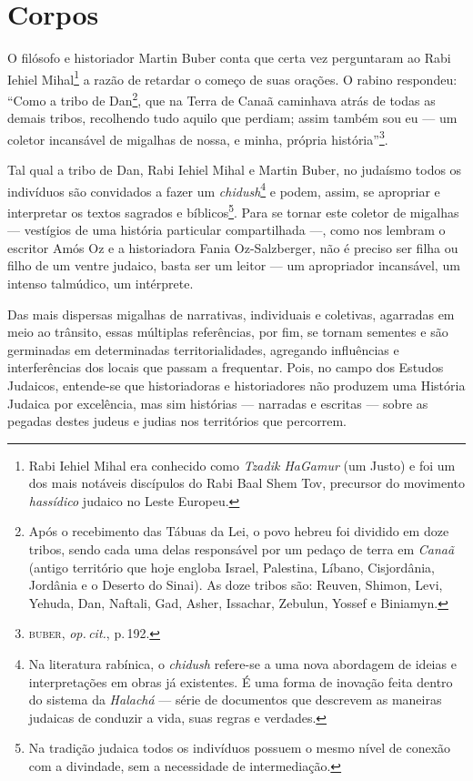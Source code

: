 \chapter{Corpos}

\noindent{}O filósofo e historiador Martin Buber conta que certa vez perguntaram ao
Rabi Iehiel Mihal\footnote{Rabi Iehiel Mihal era conhecido como
  \emph{Tzadik HaGamur} (um Justo) e foi um dos mais notáveis discípulos
  do Rabi Baal Shem Tov, precursor do movimento \emph{hassídico} judaico
  no Leste Europeu.} a razão de retardar o começo de suas orações. O
rabino respondeu: ``Como a tribo de Dan\footnote{Após o
  recebimento das Tábuas da Lei, o povo hebreu foi dividido em doze
  tribos, sendo cada uma delas responsável por um pedaço de terra em
  \emph{Canaã} (antigo território que hoje engloba Israel, Palestina,
  Líbano, Cisjordânia, Jordânia e o Deserto do Sinai). As doze tribos
  são: Reuven, Shimon, Levi, Yehuda, Dan, Naftali, Gad, Asher,
  Issachar, Zebulun, Yossef e Biniamyn.}, que na Terra de Canaã
caminhava atrás de todas as demais tribos, recolhendo tudo aquilo que
perdiam; assim também sou eu --- um coletor incansável de migalhas de
nossa, e minha, própria história''\footnote{\textsc{buber}, \emph{op.\,cit.}, p.\,192.}.

Tal qual a tribo de Dan, Rabi Iehiel Mihal e Martin Buber, no judaísmo
todos os indivíduos são convidados a fazer um \emph{chidush}\footnote{Na
  literatura rabínica, o \emph{chidush} refere-se a uma nova abordagem
  de ideias e interpretações em obras já existentes. É uma forma de
  inovação feita dentro do sistema da \emph{Halachá} --- série de
  documentos que descrevem as maneiras judaicas de conduzir a vida, suas
  regras e verdades.} e podem, assim, se apropriar e interpretar os
textos sagrados e bíblicos\footnote{Na tradição judaica todos os
  indivíduos possuem o mesmo nível de conexão com a divindade, sem a
  necessidade de intermediação.}. Para se tornar este coletor de
migalhas --- vestígios de uma história particular compartilhada ---,
como nos lembram o escritor Amós Oz e a historiadora Fania
Oz-Salzberger, não é preciso ser filha ou filho de um ventre judaico,
basta ser um leitor --- um apropriador incansável, um intenso
talmúdico, um intérprete.

Das mais dispersas migalhas de narrativas, individuais e coletivas,
agarradas em meio ao trânsito, essas múltiplas referências, por fim, se
tornam sementes e são germinadas em determinadas territorialidades,
agregando influências e interferências dos locais que passam a
frequentar. Pois, no campo dos Estudos Judaicos, entende-se que
historiadoras e historiadores não produzem uma História Judaica por
excelência, mas sim histórias --- narradas e escritas --- sobre as
pegadas destes judeus e judias nos territórios que percorrem.

